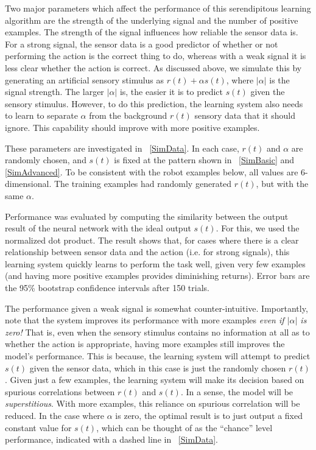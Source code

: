 \documentclass{frontiersSCNS}
\begin{document}
Two major parameters which affect the performance of this serendipitous learning
algorithm are the strength of the underlying signal and the number of positive
examples.  The strength of the signal influences how reliable the sensor
data is.  For a strong signal, the sensor data is a good predictor of whether
or not performing the action is the correct thing to do, whereas with a weak
signal it is less clear whether the action is correct.  As discussed above,
we simulate this by generating an artificial sensory stimulus as $r(t) + \alpha s(t)$,
where $|\alpha|$ is the signal strength.  The larger $|\alpha|$ is, the easier it
is to predict $s(t)$ given the sensory stimulus.  However, to do this prediction,
the learning system also needs to learn to separate $\alpha$ from the background
$r(t)$ sensory data that it should ignore.  This capability should improve
with more positive examples.

These parameters are investigated in \figurename~\ref{SimData}.  In each
case, $r(t)$ and $\alpha$ are randomly chosen, and $s(t)$ is fixed at the
pattern shown in \figurename~\ref{SimBasic} and \ref{SimAdvanced}.  To be
consistent with the robot examples below, all values are 6-dimensional.  The
training examples had randomly generated $r(t)$, but with the same $\alpha$.

Performance was evaluated by computing the similarity between the output result
of the neural network with the ideal output $s(t)$.  For this, we used the
normalized dot product.  The result shows that, for cases where there is a
clear relationship between sensor data and the action (i.e. for strong signals),
this learning system quickly learns to perform the task well, given very few examples
(and having more positive examples provides diminishing returns).  Error bars
are the 95\% bootstrap confidence intervals after 150 trials.

The performance given a weak signal is somewhat counter-intuitive.  Importantly,
note that the system improves its performance with more examples \textit{even
if $|\alpha|$ is zero!}  That is, even when the sensory stimulus contains
no information at all as to whether the action is appropriate, having more
examples still improves the model's performance.  This is because, the learning
system will attempt to predict $s(t)$ given the sensor data, which in this case
is just the randomly chosen $r(t)$.  Given just a few examples, the learning
system will make its decision based on spurious correlations between $r(t)$
and $s(t)$.  In a sense, the model will be \textit{superstitious}.  With more
examples, this reliance on spurious correlation will be reduced.  In the case
where $\alpha$ is zero, the optimal result is to just output a fixed constant
value for $s(t)$, which can be thought of as the ``chance'' level performance,
indicated with a dashed line in \figurename~\ref{SimData}.
\end{document}
